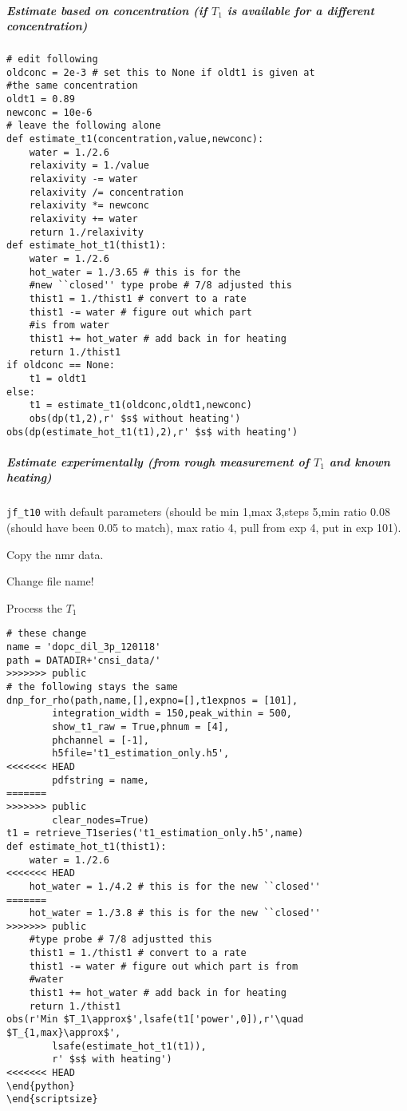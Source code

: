 \begin{scriptsize}
\begin{python}[off]
\subparagraph{Estimate based on concentration {\tiny (if $T_1$ is available for a different concentration)}}

\begin{lstlisting}
# edit following
oldconc = 2e-3 # set this to None if oldt1 is given at
#the same concentration
oldt1 = 0.89
newconc = 10e-6
# leave the following alone
def estimate_t1(concentration,value,newconc):
    water = 1./2.6
    relaxivity = 1./value
    relaxivity -= water
    relaxivity /= concentration
    relaxivity *= newconc
    relaxivity += water
    return 1./relaxivity
def estimate_hot_t1(thist1):
    water = 1./2.6
    hot_water = 1./3.65 # this is for the
    #new ``closed'' type probe # 7/8 adjusted this
    thist1 = 1./thist1 # convert to a rate
    thist1 -= water # figure out which part
    #is from water
    thist1 += hot_water # add back in for heating
    return 1./thist1
if oldconc == None:
    t1 = oldt1
else:
    t1 = estimate_t1(oldconc,oldt1,newconc)
    obs(dp(t1,2),r' $s$ without heating')
obs(dp(estimate_hot_t1(t1),2),r' $s$ with heating')
\end{lstlisting}

\subparagraph{Estimate experimentally (from rough measurement of $T_1$ and known heating)}
\texttt{jf\_t10} with default parameters (should be min 1,max 3,steps 5,min ratio 0.08 (should have been 0.05 to match), max ratio 4, pull from exp 4, put in exp 101).

Copy the nmr data.

Change file name!

Process the $T_1$

\begin{scriptsize}
\begin{lstlisting}
# these change
name = 'dopc_dil_3p_120118'
path = DATADIR+'cnsi_data/'
>>>>>>> public
# the following stays the same
dnp_for_rho(path,name,[],expno=[],t1expnos = [101],
        integration_width = 150,peak_within = 500,
        show_t1_raw = True,phnum = [4],
        phchannel = [-1],
        h5file='t1_estimation_only.h5',
<<<<<<< HEAD
        pdfstring = name,
=======
>>>>>>> public
        clear_nodes=True)
t1 = retrieve_T1series('t1_estimation_only.h5',name)
def estimate_hot_t1(thist1):
    water = 1./2.6
<<<<<<< HEAD
    hot_water = 1./4.2 # this is for the new ``closed''
=======
    hot_water = 1./3.8 # this is for the new ``closed''
>>>>>>> public
    #type probe # 7/8 adjustted this
    thist1 = 1./thist1 # convert to a rate
    thist1 -= water # figure out which part is from
    #water
    thist1 += hot_water # add back in for heating
    return 1./thist1
obs(r'Min $T_1\approx$',lsafe(t1['power',0]),r'\quad $T_{1,max}\approx$',
        lsafe(estimate_hot_t1(t1)),
        r' $s$ with heating')
<<<<<<< HEAD
\end{python}
\end{scriptsize}


\end{lstlisting}
\end{scriptsize}
\end{python}
\end{scriptsize}

